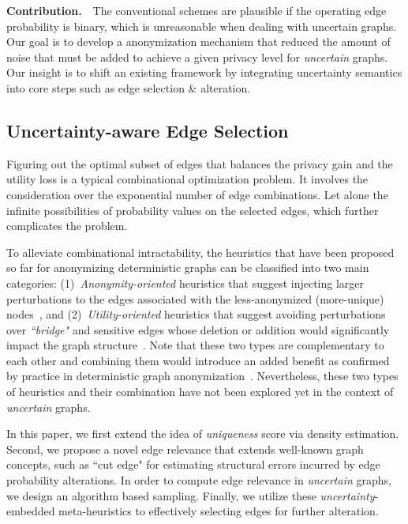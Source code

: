\textbf{Contribution.}~~The conventional schemes are plausible if the operating edge probability is binary, which is unreasonable when dealing with uncertain graphs. Our goal is to develop a anonymization mechanism that reduced the amount of noise that must be added to achieve a given privacy level for \emph{uncertain} graphs. Our insight is to shift an existing framework by integrating uncertainty semantics into core steps such as edge selection \& alteration.

\subsection{Uncertainty-aware Edge Selection}
Figuring out the optimal subset of edges that balances the privacy gain and the utility loss is a typical combinational optimization problem. It involves the consideration over the exponential number of edge combinations. Let alone the infinite possibilities of probability values on the selected edges, which further complicates the problem.

To alleviate combinational intractability, the heuristics that have been proposed so far for anonymizing deterministic graphs can be classified into two main categories: 
(1)~{\em Anonymity-oriented} heuristics that suggest injecting larger perturbations to the edges associated with the less-anonymized (more-unique) 
nodes~\cite{Boldi_Injecting_2012,Liu_Towards_2008, Thompson_The_2009,Zhou_Preserving_2008}, and 
(2)~{\em Utility-oriented} heuristics that suggest avoiding perturbations over {\em ``bridge"} and sensitive edges whose deletion or addition would 
significantly impact the graph structure~\cite{casasprivacy,Ying_Randomizing_2008,Liu_Privacy_2009,Ninggal_Utility_2015}.
Note that these two types are complementary to each other and combining them would introduce an added benefit as confirmed by practice in deterministic graph anonymization~\cite{casasprivacy}. Nevertheless, these two types of heuristics and their combination have not been explored yet in the context of \emph{uncertain} graphs.

In this paper, we first extend the idea of \emph{uniqueness} score via density estimation. Second, we propose a novel edge relevance that extends well-known graph concepts, such as ``cut edge" for estimating structural errors incurred by edge probability alterations. In order to compute edge relevance in \emph{uncertain} graphs, we design an algorithm based sampling. Finally, we utilize these \emph{uncertainty}-embedded meta-heuristics to effectively selecting edges for further alteration. 

